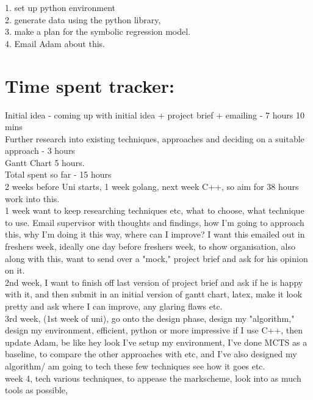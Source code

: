 \documentclass [12pt]{article}
\begin{document}
1. set up python environment\\
2. generate data using the python library,\\ 
3. make a plan for the symbolic regression model.\\
4. Email Adam about this.\\ 












\section{Time spent tracker: }

Initial idea - coming up with initial idea + project brief + emailing - 7 hours 10 mins\\ 

Further research into existing techniques, approaches and deciding on a suitable approach - 3 hours\\ 

Gantt Chart 5 hours. \\ 


Total spent so far - 15 hours \\ 

2 weeks before Uni starts, 1 week golang, next week C++, so aim for 38 hours work into this.\\ 
1 week want to keep researching techniques etc, what to choose, what technique to use. Email supervisor with 
thoughts and findings, how I'm going to approach this, why I'm doing it this way, where can I improve? 
I want this emailed out in freshers week, ideally one day before freshers week, to show organisation, also along with this, 
want to send over a "mock," project brief and ask for his opinion on it.\\ 
2nd week, I want to finish off last version of project brief and ask if he is happy with it, and then submit in an 
initial version of gantt chart, latex, make it look pretty and ask where I can improve, any glaring flaws etc.\\ 
3rd week, (1st week of uni), go onto the design phase, design my "algorithm," design my environment, efficient, 
python or more impressive if I use C++, then update Adam, be like hey look I've setup my environment, I've done MCTS as a baseline, 
to compare the other approaches with etc, and I've also designed my algorithm/ am going to tech these few techniques see how it 
goes etc.\\ 
week 4, tech various techniques, to appease the markscheme, look into as much tools as possible, 
\end{document}
